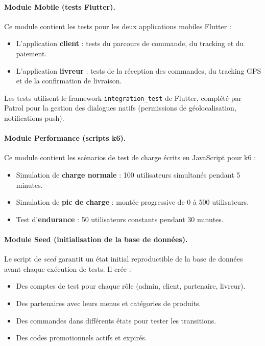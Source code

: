 \paragraph{Module Mobile (tests Flutter).}
Ce module contient les tests pour les deux applications mobiles Flutter :
\begin{itemize}[nosep]
    \item L'application \textbf{client} : tests du parcours de commande, du tracking et du paiement.
    \item L'application \textbf{livreur} : tests de la réception des commandes, du tracking GPS et de la confirmation de livraison.
\end{itemize}

Les tests utilisent le framework \texttt{integration\_test} de Flutter, complété par Patrol pour la gestion des dialogues natifs (permissions de géolocalisation, notifications push).

\paragraph{Module Performance (scripts k6).}
Ce module contient les scénarios de test de charge écrits en JavaScript pour k6 :
\begin{itemize}[nosep]
    \item Simulation de \textbf{charge normale} : 100 utilisateurs simultanés pendant 5 minutes.
    \item Simulation de \textbf{pic de charge} : montée progressive de 0 à 500 utilisateurs.
    \item Test d'\textbf{endurance} : 50 utilisateurs constants pendant 30 minutes.
\end{itemize}

\paragraph{Module Seed (initialisation de la base de données).}
Le script de \textit{seed} garantit un état initial reproductible de la base de données avant chaque exécution de tests. Il crée :
\begin{itemize}[nosep]
    \item Des comptes de test pour chaque rôle (admin, client, partenaire, livreur).
    \item Des partenaires avec leurs menus et catégories de produits.
    \item Des commandes dans différents états pour tester les transitions.
    \item Des codes promotionnels actifs et expirés.
\end{itemize}

